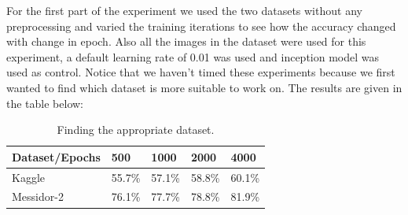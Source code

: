 \documentclass[12pt]{report}
\begin{document}
\noindent For the first part of the experiment we used the two datasets without any preprocessing and varied the training iterations to see how the accuracy changed with change in epoch. Also all the images in the dataset were used for this experiment, a default learning rate of 0.01 was used and inception model was used as control. Notice that we haven't timed these experiments because we first wanted to find which dataset is more suitable to work on. The results are given in the table below:
\begin{table}[H]
\begin{center}
\begin{tabular}{ |p{5cm}|p{2cm}|p{2cm}|p{2cm}|p{2cm}| }
 \hline
 Dataset/Epochs & 500 & 1000 & 2000 & 4000\\ 
 \hline
 Kaggle & 55.7\% &  57.1\% &  58.8\% & 60.1\% \\  
 \hline
 Messidor-2 &  76.1\% &  77.7\% &  78.8\% &  81.9\%\\   
 \hline
\end{tabular}
\caption{Finding the appropriate dataset.}
\end{center}
\end{table}
\end{document}

